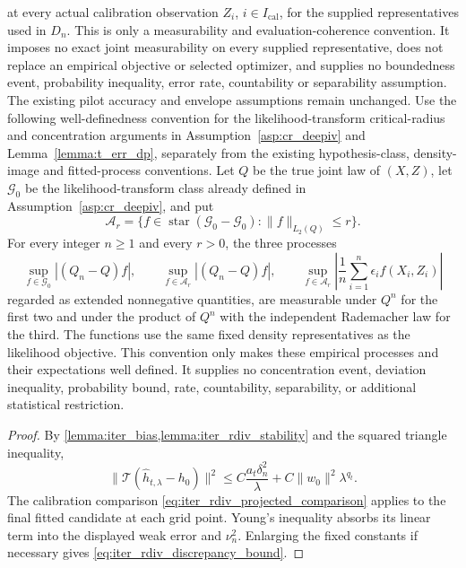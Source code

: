 \begin{corollary}
at every actual calibration observation $Z_i$, $i\in I_{\mathrm{cal}}$, for the supplied representatives used in $D_n$. This is only a measurability and evaluation-coherence convention. It imposes no exact joint measurability on every supplied representative, does not replace an empirical objective or selected optimizer, and supplies no boundedness event, probability inequality, error rate, countability or separability assumption. The existing pilot accuracy and envelope assumptions remain unchanged. Use the following well-definedness convention for the likelihood-transform critical-radius and concentration arguments in Assumption~\ref{asp:cr_deepiv} and Lemma~\ref{lemma:t_err_dp}, separately from the existing hypothesis-class, density-image and fitted-process conventions. Let $Q$ be the true joint law of $(X,Z)$, let $\mathcal G_0$ be the likelihood-transform class already defined in Assumption~\ref{asp:cr_deepiv}, and put \[ \mathcal A_r=\{f\in\operatorname{star}(\mathcal G_0-\mathcal G_0):\|f\|_{L_2(Q)}\leqslant r\}. \] For every integer $n\geqslant1$ and every $r>0$, the three processes \[ \sup_{f\in\mathcal G_0}|(Q_n-Q)f|,\qquad \sup_{f\in\mathcal A_r}|(Q_n-Q)f|,\qquad \sup_{f\in\mathcal A_r}\left|\frac1n\sum_{i=1}^n\epsilon_i f(X_i,Z_i)\right| \] regarded as extended nonnegative quantities, are measurable under $Q^n$ for the first two and under the product of $Q^n$ with the independent Rademacher law for the third. The functions use the same fixed density representatives as the likelihood objective. This convention only makes these empirical processes and their expectations well defined. It supplies no concentration event, deviation inequality, probability bound, rate, countability, separability, or additional statistical restriction.
\end{corollary}
\begin{proof}
By \cref{lemma:iter_bias,lemma:iter_rdiv_stability} and the squared triangle inequality,
\[
\|\mathcal T(\hat h_{t,\lambda}-h_0)\|^2
\leqslant
C\frac{a_t\delta_n^2}{\lambda}
+C\|w_0\|^2\lambda^{q_t}.
\]
The calibration comparison \eqref{eq:iter_rdiv_projected_comparison} applies to the final fitted candidate at each grid point. Young's inequality absorbs its linear term into the displayed weak error and $\nu_n^2$. Enlarging the fixed constants if necessary gives \eqref{eq:iter_rdiv_discrepancy_bound}.
\end{proof}

